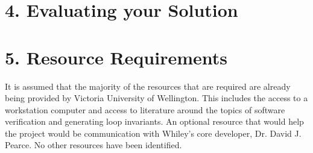 \documentclass[11pt, a4paper, twoside, openright]{report}
\begin{document}
\section*{4. Evaluating your Solution}




\section*{5. Resource Requirements}


It is assumed that the majority of the resources that are required  are already being
provided by Victoria University of Wellington.
This includes the access to a workstation computer and access to literature around the
topics of software verification and generating loop invariants.
An optional resource that would help the project would be communication
with Whiley's core developer, Dr. David J. Pearce.
No other resources have been identified.



\backmatter

%


\end{document}
